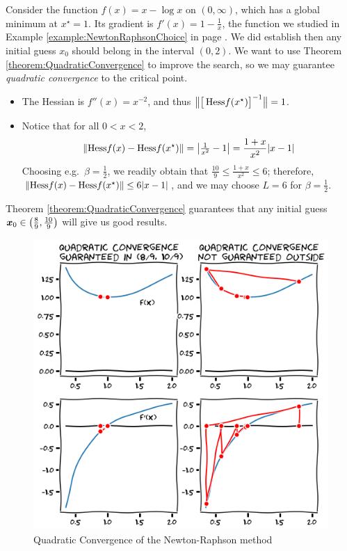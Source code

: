 \begin{example}
Consider the function $f(x)=x-\log x$ on $(0,\infty)$, which has a global minimum at $x^\star=1$.  Its gradient is $f'(x)=1-\tfrac{1}{x}$, the function we studied in Example \ref{example:NewtonRaphsonChoice} in page \pageref{example:NewtonRaphsonChoice}.  We did establish then any initial guess $x_0$ should belong in the interval $(0,2)$.  We want to use Theorem \ref{theorem:QuadraticConvergence} to improve the search, so we may guarantee \emph{quadratic convergence} to the critical point.  
\begin{itemize}
	\item The Hessian is $f''(x)=x^{-2}$, and thus $\big\lVert \big[ \mathop{\mathrm{Hess}{f}}(x^\star) \big]^{-1} \big\rVert = 1$. 
	\item Notice that for all $0<x<2$,
	\begin{equation*}
	\lVert \mathop{\mathrm{Hess}{f}}(x) - \mathop{\mathrm{Hess}{f}}(x^\star) \rVert = \big\lvert \tfrac{1}{x^2}  - 1 \big\rvert =\frac{1+x}{x^2}\lvert x-1 \rvert
	\end{equation*}
	Choosing e.g.~$\beta=\tfrac{1}{2}$, we readily obtain that $\frac{10}{9} \leq \frac{1+x}{x^2}\leq 6$;
	therefore, $\lVert \mathop{\mathrm{Hess}{f}}(x) - \mathop{\mathrm{Hess}{f}}(x^\star) \rVert \leq 6 \lvert x-1 \rvert$, and we may choose $L=6$ for $\beta=\tfrac{1}{2}$.
\end{itemize}
Theorem \ref{theorem:QuadraticConvergence} guarantees that any initial guess $\boldsymbol{x}_0 \in \big(\tfrac{8}{9}, \tfrac{10}{9}\big)$ will give us good results.  

\begin{figure}[ht!]
\includegraphics[width=0.75\linewidth]{quadraticConv.png}
\caption{Quadratic Convergence of the Newton-Raphson method}
\label{figure:QuadraticConvergence}
\end{figure}
\end{example}